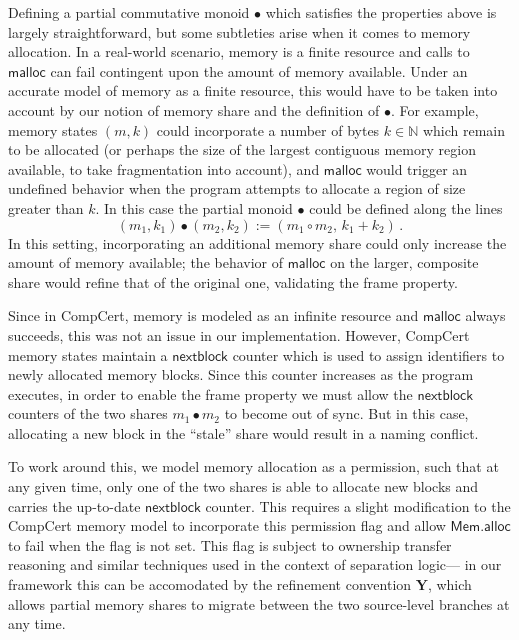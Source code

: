 \documentclass[acmsmall,screen,review,nonacm]{acmart}
\newcommand{\kw}[1]{\ensuremath{ \mathsf{#1} }}
\begin{document}
\begin{remark}
Defining a partial commutative monoid $\bullet$
which satisfies the properties above
is largely straightforward,
but some subtleties arise when it comes to memory allocation.
In a real-world scenario,
memory is a finite resource and calls to $\kw{malloc}$ can fail
contingent upon the amount of memory available.
Under an accurate model of memory as a finite resource,
this would have to be taken into account by our notion of memory share
and the definition of $\bullet$.
For example,
memory states $(m, k)$ could incorporate a number of bytes $k \in \mathbb{N}$
which remain to be allocated
(or perhaps the size of the largest contiguous memory region available,
to take fragmentation into account),
and $\kw{malloc}$ would trigger an undefined behavior
when the program attempts to allocate a region of size greater than $k$.
In this case the partial monoid $\bullet$
could be defined along the lines
\[
  (m_1, k_1) \bullet (m_2, k_2) :=
  (m_1 \circ m_2, \, k_1 + k_2)
  \,.
\]
In this setting,
incorporating an additional memory share
could only increase the amount of memory available;
the behavior of $\kw{malloc}$ on the larger, composite share
would refine that of the original one,
validating the frame property.

Since in CompCert,
memory is modeled as an infinite resource
and $\kw{malloc}$ always succeeds,
this was not an issue in our implementation.
However,
CompCert memory states maintain a $\kw{nextblock}$
counter which is used to assign identifiers
to newly allocated memory blocks.
Since this counter increases as the program executes,
in order to enable the frame property
we must allow the $\kw{nextblock}$ counters of the two shares
$m_1 \bullet m_2$ to become out of sync.
But in this case, allocating a new block in the ``stale'' share
would result in a naming conflict.

To work around this,
we model memory allocation as a permission,
such that at any given time, only one of the two shares
is able to allocate new blocks
and carries the up-to-date $\kw{nextblock}$ counter.
This requires a slight modification to the CompCert memory model
to incorporate this permission flag and allow $\kw{Mem.alloc}$ to fail
when the flag is not set.
This flag is subject to
ownership transfer reasoning
and similar techniques used in the context of separation logic---%
in our framework this can be accomodated by the
refinement convention $\mathbf{Y}$,
which allows partial memory shares to migrate between the two
source-level branches at any time.
\end{remark}
\end{document}
